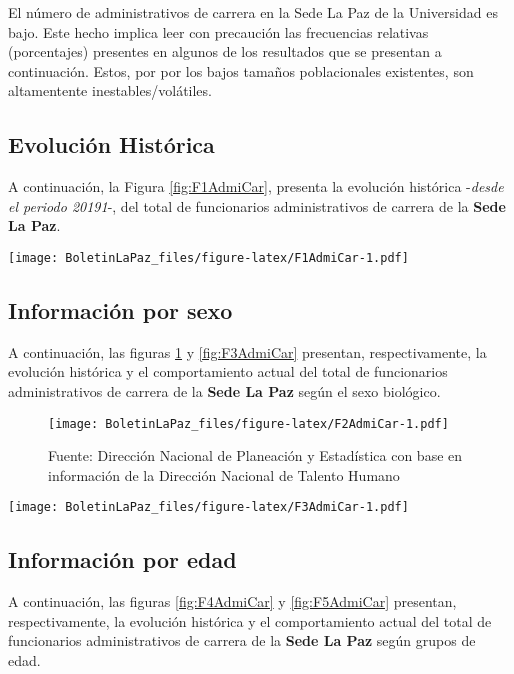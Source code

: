 \documentclass[
]{book}
\begin{document}
El número de administrativos de carrera en la Sede La Paz de la Universidad es bajo. Este hecho implica leer con precaución las frecuencias relativas (porcentajes) presentes en algunos de los resultados que se presentan a continuación. Estos, por por los bajos tamaños poblacionales existentes, son altamentente inestables/volátiles.

\hypertarget{evoluciuxf3n-histuxf3rica-3}{%
\subsection{Evolución Histórica}\label{evoluciuxf3n-histuxf3rica-3}}

A continuación, la Figura \ref{fig:F1AdmiCar}, presenta la evolución histórica -\emph{desde el periodo 20191}-, del total de funcionarios administrativos de carrera de la \textbf{Sede La Paz}.

\texttt{[image: BoletinLaPaz\_files/figure-latex/F1AdmiCar-1.pdf]}

\hypertarget{informaciuxf3n-por-sexo-3}{%
\subsection{Información por sexo}\label{informaciuxf3n-por-sexo-3}}

A continuación, las figuras \ref{fig:F2AdmiCar} y \ref{fig:F3AdmiCar} presentan, respectivamente, la evolución histórica y el comportamiento actual del total de funcionarios administrativos de carrera de la \textbf{Sede La Paz} según el sexo biológico.

\begin{figure}
\centering
\texttt{[image: BoletinLaPaz\_files/figure-latex/F2AdmiCar-1.pdf]}
\caption{\label{fig:F2AdmiCar}Fuente: Dirección Nacional de Planeación y Estadística con base en información de la Dirección Nacional de Talento Humano}
\end{figure}

\texttt{[image: BoletinLaPaz\_files/figure-latex/F3AdmiCar-1.pdf]}

\hypertarget{informaciuxf3n-por-edad-3}{%
\subsection{Información por edad}\label{informaciuxf3n-por-edad-3}}

A continuación, las figuras \ref{fig:F4AdmiCar} y \ref{fig:F5AdmiCar} presentan, respectivamente, la evolución histórica y el comportamiento actual del total de funcionarios administrativos de carrera de la \textbf{Sede La Paz} según grupos de edad.
\end{document}
